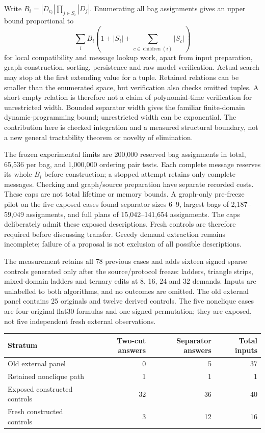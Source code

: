 Write $B_i=|D_{v_i}|\prod_{j\in S_i}|D_j|$. Enumerating all bag assignments gives
an upper bound proportional to
\[
 \sum_i B_i\left(1+|S_i|+\sum_{c\in\operatorname{children}(i)}|S_c|\right)
\]
for local compatibility and message lookup work, apart from input preparation,
graph construction, sorting, persistence and raw-model verification. Actual
search may stop at the first extending value for a tuple. Retained relations
can be smaller than the enumerated space, but verification also checks omitted
tuples. A short empty relation is therefore not a claim of polynomial-time
verification for unrestricted width. Bounded separator width gives the familiar
finite-domain dynamic-programming bound; unrestricted width can be exponential.
The contribution here is checked integration and a measured structural boundary,
not a new general tractability theorem or novelty of elimination.

The frozen experimental limits are 200,000 reserved bag assignments in total,
65,536 per bag, and 1,000,000 ordering pair tests. Each complete message reserves
its whole $B_i$ before construction; a stopped attempt retains only complete
messages. Checking and graph/source preparation have separate recorded costs.
These caps are not total lifetime or memory bounds. A graph-only pre-freeze pilot
on the five exposed cases found separator sizes 6--9, largest bags of
2,187--59,049 assignments, and full plans of 15,042--141,654 assignments.
The caps deliberately admit these exposed descriptions. Fresh controls are
therefore required before discussing transfer. Greedy demand extraction remains
incomplete; failure of a proposal is not exclusion of all possible descriptions.

The measurement retains all 78 previous cases and adds sixteen signed sparse
controls generated only after the source/protocol freeze: ladders, triangle
strips, mixed-domain ladders and ternary edits at 8, 16, 24 and 32 demands.
Inputs are unlabelled to both algorithms, and no outcomes are omitted. The old
external panel contains 25 originals and twelve derived controls. The five
nonclique cases are four original flat30 formulas and one signed permutation;
they are exposed, not five independent fresh external observations.

\begin{center}
\begin{tabular}{lrrr}
\toprule
Stratum & Two-cut answers & Separator answers & Total inputs \\
\midrule
Old external panel & 0 & 5 & 37 \\
Retained nonclique path & 1 & 1 & 1 \\
Exposed constructed controls & 32 & 36 & 40 \\
Fresh constructed controls & 3 & 12 & 16 \\
\bottomrule
\end{tabular}
\end{center}

